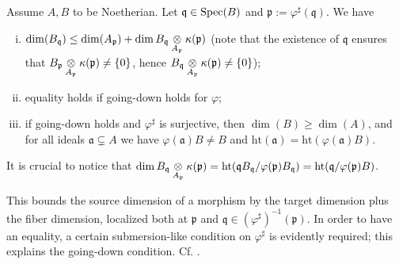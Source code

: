 \begin{proposition}\label{prop:fiber-ineq}
	Assume $A, B$ to be Noetherian. Let $\mathfrak{q} \in \operatorname{Spec}(B)$ and $\mathfrak{p} := \varphi^\sharp(\mathfrak{q})$. We have
	\begin{enumerate}[(i)]
		\item $\dim(B_{\mathfrak{q}}) \leq \dim(A_{\mathfrak{p}}) + \dim B_{\mathfrak{q}} \underset{A_{\mathfrak{p}}}{\otimes} \kappa(\mathfrak{p})$ (note that the existence of $\mathfrak{q}$ ensures that $B_{\mathfrak{p}} \underset{A_{\mathfrak{p}}}{\otimes} \kappa(\mathfrak{p}) \neq \{0\}$, hence $B_{\mathfrak{q}} \underset{A_{\mathfrak{p}}}{\otimes} \kappa(\mathfrak{p}) \neq \{0\}$);
		\item equality holds if going-down holds for $\varphi$;
		\item if going-down holds and $\varphi^\sharp$ is surjective, then $\dim(B) \geq \dim(A)$, and for all ideals $\mathfrak{a} \subsetneq A$ we have $\varphi(\mathfrak{a}) B \neq B$ and $\mathrm{ht}(\mathfrak{a}) = \mathrm{ht}(\varphi(\mathfrak{a})B)$.
	\end{enumerate}
\end{proposition}

It is crucial to notice that $\dim B_{\mathfrak{q}} \underset{A_{\mathfrak{p}}}{\otimes} \kappa(\mathfrak{p}) = \text{ht}(\mathfrak{q}B_{\mathfrak{q}}/\varphi(\mathfrak{p}) B_{\mathfrak{q}}) = \text{ht}(\mathfrak{q}/\varphi(\mathfrak{p})B)$.

This bounds the source dimension of a morphism by the target dimension plus the fiber dimension, localized both at $\mathfrak{p}$ and $\mathfrak{q} \in (\varphi^\sharp)^{-1}(\mathfrak{p})$. In order to have an equality, a certain submersion-like condition on $\varphi^\sharp$ is evidently required; this explains the going-down condition. Cf. \cite[(6.H)]{Mat80}.


